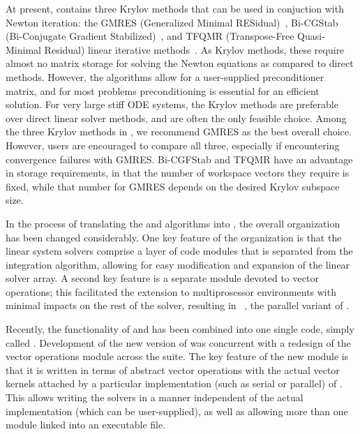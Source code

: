 At present, {\cvode} contains three Krylov methods that can be used
in conjuction with Newton iteration:
the GMRES (Generalized Minimal RESidual)~\cite{SaSc:86},
Bi-CGStab (Bi-Conjugate Gradient Stabilized)~\cite{Van:92}, and
TFQMR (Transpose-Free Quasi-Minimal Residual) linear iterative 
methods~\cite{Fre:93}.  As Krylov methods, these require almost no 
matrix storage for solving the Newton equations as compared to direct 
methods. However, the algorithms allow for a user-supplied preconditioner
matrix, and for most problems preconditioning is essential for an
efficient solution.
For very large stiff ODE systems, the Krylov methods are preferable over
direct linear solver methods, and are often the only feasible choice.
Among the three Krylov methods in {\cvode}, we recommend GMRES as the
best overall choice.  However, users are encouraged to compare all
three, especially if encountering convergence failures with GMRES.
Bi-CGFStab and TFQMR have an advantage in storage requirements, in
that the number of workspace vectors they require is fixed, while that
number for GMRES depends on the desired Krylov subspace size.

In the process of translating the {\vode} and {\vodpk} algorithms into
{\C}, the overall {\cvode} organization has been changed considerably.
One key feature of the {\cvode} organization is that the linear system
solvers comprise a layer of code modules that is separated from the
integration algorithm, allowing for easy modification and expansion of
the linear solver array.  A second key feature is a separate module
devoted to vector operations; this facilitated the extension to
multiprosessor environments with minimal impacts on the rest of the
solver, resulting in {\pvode}~\cite{ByHi:99},
the parallel variant of {\cvode}.  

 Recently,
the functionality of {\cvode} and {\pvode} has been combined into one
single code, simply called {\cvode}. Development of the new version of
{\cvode} was concurrent with a redesign of the vector operations
module across the {\sundials} suite. The key feature of the new
{\nvector} module is that it is written in terms of abstract vector
operations with the actual vector kernels attached by a particular
implementation (such as serial or parallel) of {\nvector}. This allows
writing the {\sundials} solvers in a manner independent of the actual
{\nvector} implementation (which can be user-supplied), as well as
allowing more than one {\nvector} module linked into an executable file.

